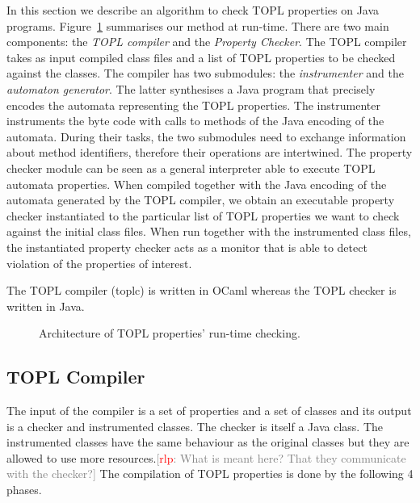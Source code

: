 \documentclass{sigplanconf}[10pt] %
\newcommand{\noterg}[2]{\textcolor{gray}{[\textcolor{red}{#1}: #2]}}
\newcommand{\rlp}[1]{\noterg{rlp}{#1}}
\begin{document}
In this section we describe an algorithm to check TOPL properties on Java programs.
Figure~\ref{architecture} summarises our method at run-time.
There are two main components:
the {\em TOPL compiler} and the {\em Property Checker}.
The TOPL compiler takes as input compiled class files and a list of TOPL properties to be checked against the classes.
The compiler has two submodules: the {\em instrumenter} and the {\em automaton generator}.
The latter synthesises a Java program that precisely encodes the automata representing the TOPL properties.
The instrumenter instruments the byte code with calls to methods of the Java encoding of the automata.
During their tasks, the two submodules need to exchange information about method identifiers, therefore their operations are intertwined.
The property checker module can be seen as a general interpreter able to execute TOPL automata properties.
When compiled together with the Java encoding of the automata generated by the TOPL compiler, we obtain an executable property checker instantiated to the particular list of TOPL properties we want to check against the initial class files.
When run together with the instrumented class files, the instantiated property checker acts as a monitor that is able to detect violation of the properties of interest.

The TOPL compiler (\textsf{toplc}) is written in OCaml whereas  the TOPL checker is written in Java.

\begin{figure}[htbp]
\begin{center}

\caption{Architecture of TOPL properties' run-time checking.}
\label{architecture}
\end{center}
\end{figure}

\subsection{TOPL Compiler} %

The input of the compiler is a set of properties and a set of classes and its output  is a checker and instrumented classes.
The checker is itself a Java class.
The instrumented classes have the same behaviour as the original classes but
 they are allowed to use more resources.\rlp{What is meant here? That
   they communicate with the checker?}
The compilation of TOPL properties is done by the following 4 phases.
\end{document}
